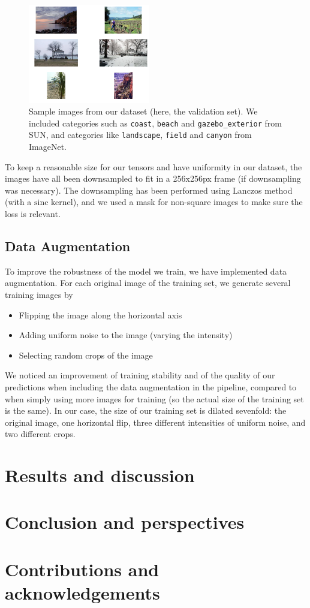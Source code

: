 \documentclass[10pt,twocolumn,letterpaper]{article}
\begin{document}
\begin{figure}
\begin{center}
\includegraphics[width=200px]{sampletrain.png}
\caption{Sample images from our dataset (here, the validation set). We included categories such as \texttt{coast}, \texttt{beach} and \texttt{gazebo\_exterior} from SUN, and categories like \texttt{landscape}, \texttt{field} and \texttt{canyon} from ImageNet.}
\label{sampletrain}
\end{center}
\end{figure}

To keep a reasonable size for our tensors and have uniformity in our dataset, the images have all been downsampled to fit in a 256x256px frame (if downsampling was necessary). The downsampling has been performed using Lanczos method (with a $\text{sinc}$ kernel), and we used a mask for non-square images to make sure the loss is relevant. 

\subsection{Data Augmentation}

To improve the robustness of the model we train, we have implemented data augmentation. For each original image of the training set, we generate several training images by 
\begin{itemize}
\item Flipping the image along the horizontal axis
\item Adding uniform noise to the image (varying the intensity)
\item Selecting random crops of the image
\end{itemize}

We noticed an improvement of training stability and of the quality of our predictions when including the data augmentation in the pipeline, compared to when simply using more images for training (so the actual size of the training set is the same). In our case, the size of our training set is dilated sevenfold: the original image, one horizontal flip, three different intensities of uniform noise, and two different crops.

\section{Results and discussion}
\section{Conclusion and perspectives}
\section*{Contributions and acknowledgements}


{\small


}
\end{document}
